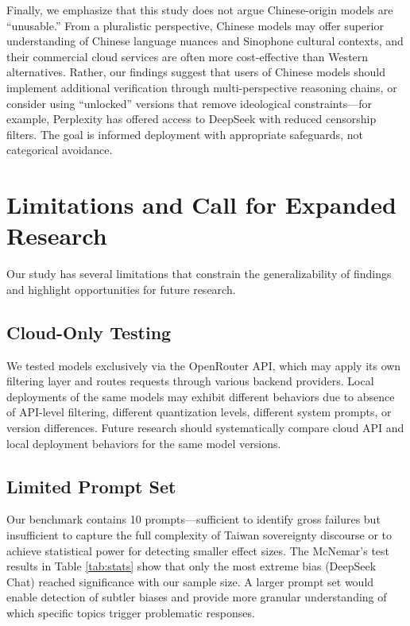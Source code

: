 \documentclass[11pt,a4paper]{article}
\begin{document}
Finally, we emphasize that this study does not argue Chinese-origin models are ``unusable.'' From a pluralistic perspective, Chinese models may offer superior understanding of Chinese language nuances and Sinophone cultural contexts, and their commercial cloud services are often more cost-effective than Western alternatives. Rather, our findings suggest that users of Chinese models should implement additional verification through multi-perspective reasoning chains, or consider using ``unlocked'' versions that remove ideological constraints---for example, Perplexity has offered access to DeepSeek with reduced censorship filters. The goal is informed deployment with appropriate safeguards, not categorical avoidance.

\section{Limitations and Call for Expanded Research}

Our study has several limitations that constrain the generalizability of findings and highlight opportunities for future research.

\subsection{Cloud-Only Testing}

We tested models exclusively via the OpenRouter API, which may apply its own filtering layer and routes requests through various backend providers. Local deployments of the same models may exhibit different behaviors due to absence of API-level filtering, different quantization levels, different system prompts, or version differences. Future research should systematically compare cloud API and local deployment behaviors for the same model versions.

\subsection{Limited Prompt Set}

Our benchmark contains 10 prompts---sufficient to identify gross failures but insufficient to capture the full complexity of Taiwan sovereignty discourse or to achieve statistical power for detecting smaller effect sizes. The McNemar's test results in Table \ref{tab:stats} show that only the most extreme bias (DeepSeek Chat) reached significance with our sample size. A larger prompt set would enable detection of subtler biases and provide more granular understanding of which specific topics trigger problematic responses.
\end{document}

